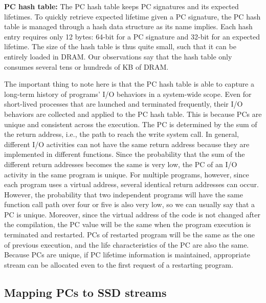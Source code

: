 \textbf{PC hash table:}
The PC hash table keeps PC signatures and its expected lifetimes. To quickly
retrieve expected lifetime given a PC signature, the PC hash table is managed
through a hash data structure as its name implies. Each hash entry requires
only 12 bytes: 64-bit for a PC signature and 32-bit for an expected lifetime.
The size of the hash table is thus quite small, such that it can be entirely
loaded in DRAM. Our observations say that the hash table only consumes several
tens or hundreds of KB of DRAM.

The important thing to note here is that the PC hash table is able to capture a
long-term history of programs' I/O behaviors in a system-wide scope.  Even for
short-lived processes that are launched and terminated frequently, their I/O
behaviors are collected and applied to the PC hash table.  This is because PCs
are unique and consistent across the execution.
The PC is determined by the sum of the return address, i.e., the path to reach the write system call. 
In general, different I/O activities can not have the same return address because they are
implemented in different functions. 
Since the probability that the sum of the different return addresses becomes the same is very low, 
the PC of an I/O activity in the same program is unique. 
For multiple programs, however, since each program uses a virtual address, 
several identical return addresses can occur. 
However, the probability that two independent programs will have the same
function call path over four or five is also very low, 
so we can usually say that a PC is unique.
Moreover, since the virtual address of the code is not changed after the compilation, 
the PC value will be the same when the program execution is terminated and restarted.
PCs of restarted program will be the same as the one of previous execution, 
and the life characteristics of the PC are also the same. 
Because PCs are unique, if PC lifetime information is maintained, 
appropriate stream can be allocated 
even to the first request of a restarting program.

\subsection{Mapping PCs to SSD streams}

